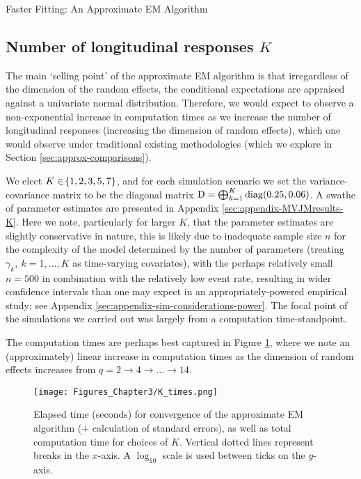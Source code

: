 \begin{chapter}{\label{cha:approx}Faster Fitting: An Approximate EM Algorithm}
  \subsection{Number of longitudinal responses \texorpdfstring{$K$}{K}}\label{sec:approx-sims-K}
  The main `selling point' of the approximate EM algorithm is that irregardless of the dimension of the random effects, the conditional expectations are appraised against a univariate normal distribution. Therefore, we would expect to observe a non-exponential increase in computation times as we increase the number of longitudinal responses (\ie increasing the dimension of random effects), which one would observe under traditional existing methodologies (which we explore in Section \ref{sec:approx-comparisons}). 

  We elect $K\in\!\left\{1,2,3,5,7\right\}$, and for each simulation scenario we set the variance-covariance matrix to be the diagonal matrix $\mathrm{D}=\bigoplus_{k=1}^K \mathrm{diag}\!\left(0.25, 0.06\right)$. A swathe of parameter estimates are presented in Appendix \ref{sec:appendix-MVJMresults-K}. Here we note, particularly for larger $K$, that the parameter estimates are slightly conservative in nature, this is likely due to inadequate sample size $n$ for the complexity of the model determined by the number of parameters (\ie treating $\gamma_k,\ k=1,\dots,K$ as time-varying covariates), with the perhaps relatively small $n=500$ in combination with the relatively low event rate, resulting in wider confidence intervals than one may expect in an appropriately-powered empirical study; see Appendix \ref{sec:appendix-sim-considerations-power}. The focal point of the simulations we carried out was largely from a computation time-standpoint.
  
  The computation times are perhaps best captured in Figure \ref{fig:approx-sims-K}, where we note an (approximately) linear increase in computation times as the dimension of random effects increases from $q=2\rightarrow4\rightarrow\dots\rightarrow14$.

  \begin{figure}[t]
      \centering
      \texttt{[image: Figures\_Chapter3/K\_times.png]}
      \caption{Elapsed time (seconds) for convergence of the approximate EM algorithm ($+$ calculation of standard errors), as well as total computation time for choices of $K$. Vertical dotted lines represent breaks in the $x$-axis. A $\log_{10}$ scale is used between ticks on the $y$-axis.}
      \label{fig:approx-sims-K}
  \end{figure}
  

\end{chapter}
